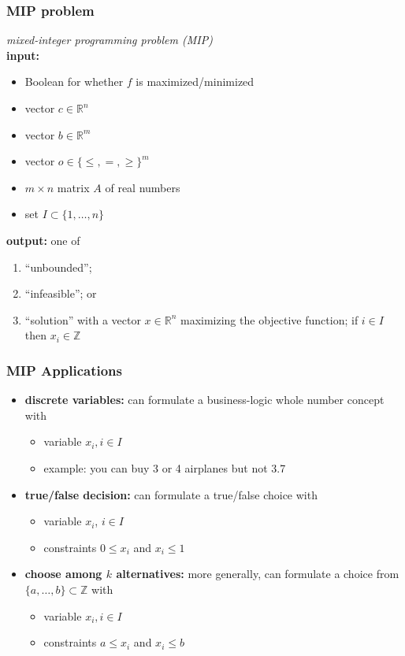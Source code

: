 \documentclass{beamer}
\begin{document}
\begin{frame} \frametitle{MIP problem}
  \emph{mixed-integer programming problem (MIP)} \\
  \textbf{input:}
  \begin{itemize}
    \item Boolean for whether $f$ is maximized/minimized
    \item vector $c \in \mathbb{R}^n$
    \item vector $b \in \mathbb{R}^m$
    \item vector $o \in \{\leq, =, \geq\}^m$
    \item $m \times n$ matrix $A$ of real numbers
    \item set $I \subset \{1, \ldots, n\}$
  \end{itemize}
  \textbf{output:} one of
  \begin{enumerate}
    \item ``unbounded'';
    \item ``infeasible''; or
    \item ``solution'' with a vector $x \in \mathbb{R}^n$
      maximizing the objective function; if $i \in I$ then $x_i \in \mathbb{Z}$
  \end{enumerate}
\end{frame}

\begin{frame} \frametitle{MIP Applications}
  \begin{itemize}
  \item \textbf{discrete variables:} can formulate a business-logic whole number concept with
  \begin{itemize}
    \item variable $x_i, i \in I$
    \item example: you can buy 3 or 4 airplanes but not 3.7
  \end{itemize}
  \item \textbf{true/false decision:} can formulate a true/false choice with
    \begin{itemize}
    \item variable $x_i$, $i \in I$
    \item constraints $0 \leq x_i$ and $x_i \leq 1$
    \end{itemize}
\item \textbf{choose among $k$ alternatives:} more generally, can
  formulate a choice from $\{a, \ldots, b\} \subset \mathbb{Z}$ with
  \begin{itemize}
  \item variable $x_i, i \in I$
  \item constraints $a \leq x_i$ and $x_i \leq b$
    \end{itemize}
  \end{itemize}
\end{frame}
\end{document}
